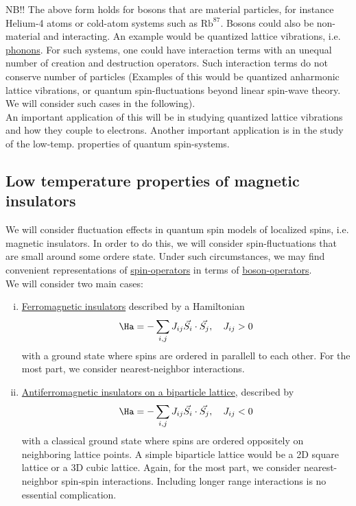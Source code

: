 NB!! The above form holds for bosons that are material particles, for instance Helium-4 atoms or cold-atom systems such as $\text{Rb}^{87}$. Bosons could also be non-material and interacting. An example would be quantized lattice vibrations, i.e. \uline{phonons}. For such systems, one could have interaction terms with an unequal number of creation and destruction operators. Such interaction terms do not conserve number of particles (Examples of this would be quantized anharmonic lattice vibrations, or quantum spin-fluctuations beyond linear spin-wave theory. We will consider such cases in the following). \\

An important application of this will be in studying quantized lattice vibrations and how they couple to electrons. Another important application is in the study of the low-temp. properties of quantum spin-systems. \\

\subsection{Low temperature properties of magnetic insulators}

We will consider fluctuation effects in quantum spin models of localized spins, i.e. magnetic insulators. In order to do this, we will consider spin-fluctuations that are small around some ordere state. Under such circumstances, we may find convenient representations of \uline{spin-operators} in terms of \uline{boson-operators}. \\

We will consider two main cases:
\begin{enumerate}[i)]
    \item \uline{Ferromagnetic insulators} described by a Hamiltonian
    \begin{equation}
        \Ha = -\sum_{i, j} J_{ij} \Vec{S_i}\cdot\Vec{S_j}, \quad J_{ij} > 0
    \end{equation}
    with a ground state where spins are ordered in parallell to each other. For the most part, we consider nearest-neighbor interactions.
    \item \uline{Antiferromagnetic insulators on a biparticle lattice}, described by
    \begin{equation}
        \Ha = -\sum_{i, j} J_{ij} \Vec{S_i}\cdot\Vec{S_j}, \quad J_{ij} < 0
    \end{equation}
    with a classical ground state where spins are ordered oppositely on neighboring lattice points. A simple biparticle lattice would be a 2D square lattice or a 3D cubic lattice. Again, for the most part, we consider nearest-neighbor spin-spin interactions. Including longer range interactions is no essential complication.
\end{enumerate}

